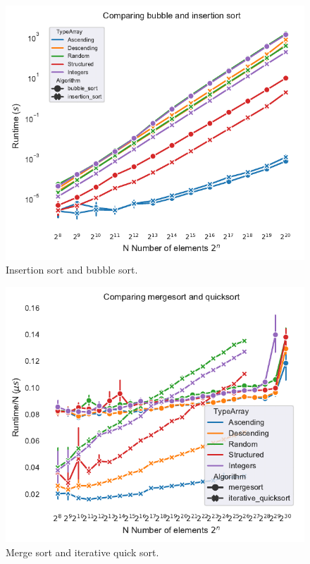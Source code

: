 \documentclass[sigconf, nonacm, natbib, screen, balance=False]{acmart}
\begin{document}
\begin{figure}[]
  \centering
  \includegraphics[scale=0.9]{runtimebubble&insertion.pdf}
  \caption{Insertion sort and bubble sort.}
  \label{fig:bubble_insertion}
\end{figure}

\begin{figure}[]
  \centering
  \includegraphics[scale=0.9]{runtime_per_n_merge&quick.pdf}
  \caption{Merge sort and iterative quick sort.}
  \label{fig:merge_quick}
\end{figure}
\end{document}
